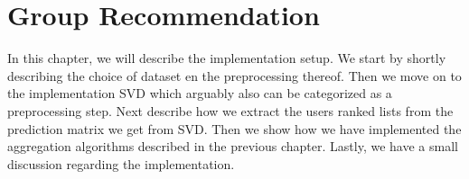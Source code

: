 \chapter{Group Recommendation} \label{group_recommendation}
In this chapter, we will describe the implementation setup. We start by shortly describing the choice of dataset en the preprocessing thereof. Then we move on to the implementation SVD which arguably also can be categorized as a preprocessing step. Next describe how we extract the users ranked lists from the prediction matrix we get from SVD. Then we show how we have implemented the aggregation algorithms described in the previous chapter. Lastly, we have a small discussion regarding the implementation.






%